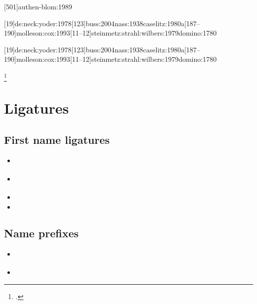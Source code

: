 \documentclass[a4paper,12pt]{scrartcl}
\newcommand{\Befehl}[1]{\texttt{\textbackslash#1}}
\begin{document}
\begin{enumerate}
		{}%
		{\item[\Befehl{sfcite}] }
		{}%
		{\item[\Befehl{sfcites}] [501]{authen-blom:1989}}
		{}%
		{\item[\Befehl{posscite}] }
		{}%
		{\item[\Befehl{posscites}] [19]{de:neck:yoder:1978}[123]{buss:2004}{nass:1938}{caselitz:1980a}[187--190]{molleson:cox:1993}[11--12]{steinmetz:strahl:wilbers:1979}{domino:1780}}
		{}%
		{\item[\Befehl{Posscite}] }
		{}%
		{\item[\Befehl{Posscites}] [19]{de:neck:yoder:1978}[123]{buss:2004}{nass:1938}{caselitz:1980a}[187--190]{molleson:cox:1993}[11--12]{steinmetz:strahl:wilbers:1979}{domino:1780}}
		{}%
    \item[\Befehl{footcite}] \footcites{auler:hiller:2015}{harsdoerffer:1656}
\end{enumerate}


\section{Ligatures}

\subsection{First name ligatures}
\begin{itemize}
    \item\cite{test::firstnames::2}%
    \item\cite{test::firstnames::1}%
    \item{}%
    \item{}%
\end{itemize}

\subsection{Name prefixes}
\begin{itemize}
    \item\cite{test::prefixnames::1}%
    \item{}%
\end{itemize}
\end{document}
